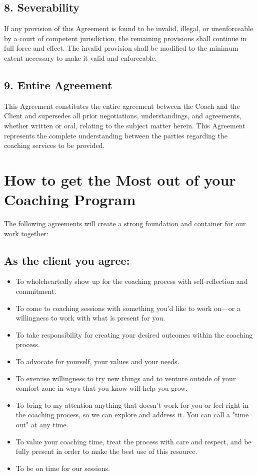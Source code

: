 \documentclass[11pt,letterpaper]{article}
\begin{document}
\subsection*{8. Severability}

If any provision of this Agreement is found to be invalid, illegal, or unenforceable by a court of competent jurisdiction, the remaining provisions shall continue in full force and effect. The invalid provision shall be modified to the minimum extent necessary to make it valid and enforceable.

\subsection*{9. Entire Agreement}

This Agreement constitutes the entire agreement between the Coach and the Client and supersedes all prior negotiations, understandings, and agreements, whether written or oral, relating to the subject matter herein. This Agreement represents the complete understanding between the parties regarding the coaching services to be provided.

\section*{How to get the Most out of your Coaching Program}

The following agreements will create a strong foundation and container for our work together:

\subsection*{As the client you agree:}

\begin{itemize}[leftmargin=*,itemsep=0pt]
\item To wholeheartedly show up for the coaching process with self-reflection and commitment.
\item To come to coaching sessions with something you'd like to work on---or a willingness to work with what is present for you.
\item To take responsibility for creating your desired outcomes within the coaching process.
\item To advocate for yourself, your values and your needs.
\item To exercise willingness to try new things and to venture outside of your comfort zone in ways that you know will help you grow.
\item To bring to my attention anything that doesn't work for you or feel right in the coaching process, so we can explore and address it. You can call a "time out" at any time.
\item To value your coaching time, treat the process with care and respect, and be fully present in order to make the best use of this resource.
\item To be on time for our sessions.
\end{itemize}
\end{document}
